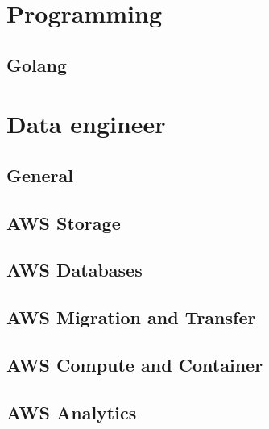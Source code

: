 \documentclass{book}
\begin{document}
\tableofcontents

\chapter{Programming}
\section{Golang}



\chapter{Data engineer}
\section{General}

\newpage
\section{AWS Storage}

\newpage
\section{AWS Databases}

\newpage
\section{AWS Migration and Transfer}

\newpage
\section{AWS Compute and Container}

\newpage
\section{AWS Analytics}

\newpage
\end{document}

